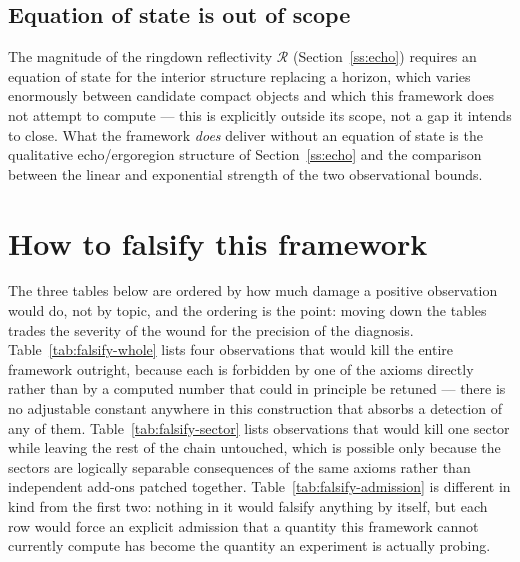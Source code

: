 \documentclass[aps,prd,twocolumn,superscriptaddress,nofootinbib]{revtex4-2}
\begin{document}
\subsection{Equation of state is out of scope}\label{ss:eos-out}

The magnitude of the ringdown reflectivity $\mathcal{R}$
(Section~\ref{ss:echo}) requires an equation of state for the interior
structure replacing a horizon, which varies enormously between candidate
compact objects and which this framework does not attempt to compute —
this is explicitly outside its scope, not a gap it intends to close. What
the framework \emph{does} deliver without an equation of state is the
qualitative echo/ergoregion structure of Section~\ref{ss:echo} and the
comparison between the linear and exponential strength of the two
observational bounds.

\section{How to falsify this framework}\label{sec:falsify}

The three tables below are ordered by how much damage a positive
observation would do, not by topic, and the ordering is the point:
moving down the tables trades the severity of the wound for the
precision of the diagnosis. Table~\ref{tab:falsify-whole} lists four
observations that would kill the entire framework outright, because each
is forbidden by one of the axioms directly rather than by a computed
number that could in principle be retuned — there is no adjustable
constant anywhere in this construction that absorbs a detection of any
of them. Table~\ref{tab:falsify-sector} lists observations that would
kill one sector while leaving the rest of the chain untouched, which is
possible only because the sectors are logically separable consequences
of the same axioms rather than independent add-ons patched together.
Table~\ref{tab:falsify-admission} is different in kind from the first
two: nothing in it would falsify anything by itself, but each row would
force an explicit admission that a quantity this framework cannot
currently compute has become the quantity an experiment is actually
probing.
\end{document}
